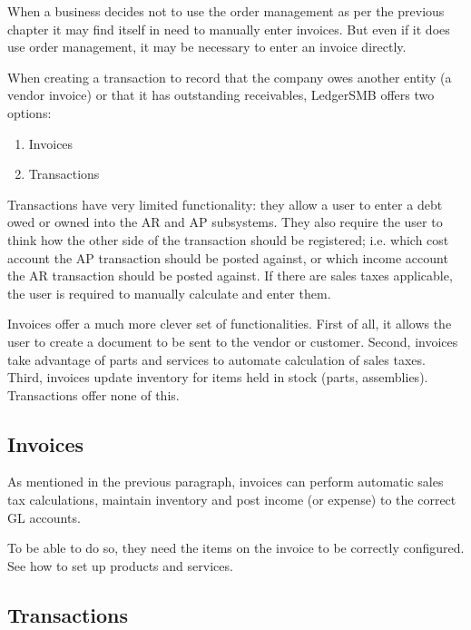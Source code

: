 
When a business decides not to use the order management as per the previous
chapter it may find itself in need to manually enter invoices. But even
if it does use order management, it may be necessary to enter an invoice
directly.

When creating a transaction to record that the company owes another
entity (a vendor invoice) or that it has outstanding receivables,
LedgerSMB offers two options:

\begin{enumerate}
\item Invoices
\item Transactions
\end{enumerate}

Transactions have very limited functionality: they allow a user to enter
a debt owed or owned into the AR and AP subsystems. They also require the
user to think how the other side of the transaction should be registered;
i.e. which cost account the AP transaction should be posted against, or
which income account the AR transaction should be posted against. If there
are sales taxes applicable, the user is required to manually calculate and
enter them.

Invoices offer a much more clever set of functionalities. First of all, it
allows the user to create a document to be sent to the vendor or customer.
Second, invoices take advantage of parts and services
to automate calculation of sales taxes. Third, invoices update inventory
for items held in stock (parts, assemblies). Transactions offer none of this.

\subsection{Invoices}

As mentioned in the previous paragraph, invoices can perform automatic
sales tax calculations, maintain inventory and post income (or expense)
to the correct GL accounts.

To be able to do so, they need the items on the invoice to be correctly
configured. See  how to set up products
and services.


\subsection{Transactions}

